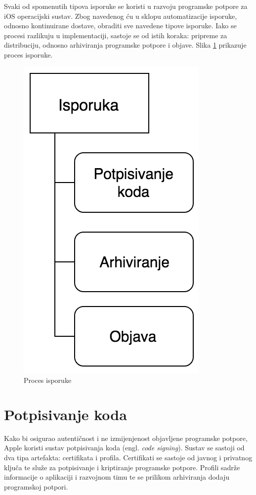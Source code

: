 \documentclass[times, utf8, diplomski, numeric]{fer}
\newcommand{\eng}[1]{(engl. \textit{#1})}
\begin{document}
Svaki od spomenutih tipova isporuke se koristi u razvoju programske potpore za iOS operacijski sustav. Zbog navedenog ću u sklopu automatizacije isporuke, odnosno kontinuirane dostave, obraditi sve navedene tipove isporuke. Iako se procesi razlikuju u implementaciji, sastoje se od istih koraka: pripreme za distribuciju, odnosno arhiviranja programske potpore i objave. Slika \ref{fig:ContinuousDelivery} prikazuje proces isporuke.

\begin{figure}
\centering
\includegraphics[scale=0.6]{ContinuousDelivery}
\caption{Proces isporuke}
\label{fig:ContinuousDelivery}
\end{figure}

\section{Potpisivanje koda}

Kako bi osigurao autentičnost i ne izmijenjenost objavljene programske potpore, Apple koristi sustav potpisivanja koda \eng{code signing}. Sustav se sastoji od dva tipa artefakta: certifikata i profila. Certifikati se sastoje od javnog i privatnog ključa te služe za potpisivanje i kriptiranje programske potpore. Profili sadrže informacije o aplikaciji i razvojnom timu te se prilikom arhiviranja dodaju programskoj potpori.
\end{document}
